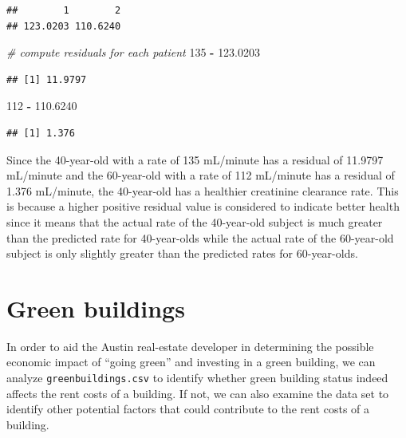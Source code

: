 \documentclass[]{article}
\newenvironment{Shaded}{\begin{snugshade}}{\end{snugshade}}
\newcommand{\CommentTok}[1]{\textcolor[rgb]{0.56,0.35,0.01}{\textit{#1}}}
\newcommand{\DecValTok}[1]{\textcolor[rgb]{0.00,0.00,0.81}{#1}}
\newcommand{\FloatTok}[1]{\textcolor[rgb]{0.00,0.00,0.81}{#1}}
\newcommand{\OperatorTok}[1]{\textcolor[rgb]{0.81,0.36,0.00}{\textbf{#1}}}
\newcommand{\StringTok}[1]{\textcolor[rgb]{0.31,0.60,0.02}{#1}}
\begin{document}
\begin{verbatim}
##        1        2 
## 123.0203 110.6240
\end{verbatim}

\begin{Shaded}
\begin{Highlighting}[]
\CommentTok{# compute residuals for each patient}
\DecValTok{135} \OperatorTok{-}\StringTok{ }\FloatTok{123.0203}
\end{Highlighting}
\end{Shaded}

\begin{verbatim}
## [1] 11.9797
\end{verbatim}

\begin{Shaded}
\begin{Highlighting}[]
\DecValTok{112} \OperatorTok{-}\StringTok{ }\FloatTok{110.6240}
\end{Highlighting}
\end{Shaded}

\begin{verbatim}
## [1] 1.376
\end{verbatim}

Since the 40-year-old with a rate of 135 mL/minute has a residual of
11.9797 mL/minute and the 60-year-old with a rate of 112 mL/minute has a
residual of 1.376 mL/minute, the 40-year-old has a healthier creatinine
clearance rate. This is because a higher positive residual value is
considered to indicate better health since it means that the actual rate
of the 40-year-old subject is much greater than the predicted rate for
40-year-olds while the actual rate of the 60-year-old subject is only
slightly greater than the predicted rates for 60-year-olds.

\hypertarget{green-buildings}{%
\section{Green buildings}\label{green-buildings}}

In order to aid the Austin real-estate developer in determining the
possible economic impact of ``going green'' and investing in a green
building, we can analyze \texttt{greenbuildings.csv} to identify whether
green building status indeed affects the rent costs of a building. If
not, we can also examine the data set to identify other potential
factors that could contribute to the rent costs of a building.
\end{document}
